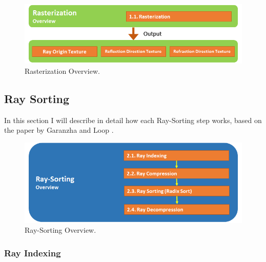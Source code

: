 \documentclass{llncs}
\begin{document}
\begin{figure}
\centering
\includegraphics[scale=0.60]{images/figure 2.png}
\caption{Rasterization Overview.}
\end{figure}

\vspace*{-20pt}

\newpage

%
\subsection{Ray Sorting}
%

In this section I will describe in detail how each Ray-Sorting step works, based on the paper by Garanzha and Loop \cite{GaranzhaLoop10}.

\begin{figure}
\centering
\includegraphics[scale=0.60]{images/figure 3.png}
\caption{Ray-Sorting Overview.}
\end{figure}

\vspace*{-20pt}

%
\subsubsection{Ray Indexing}
%
\end{document}
